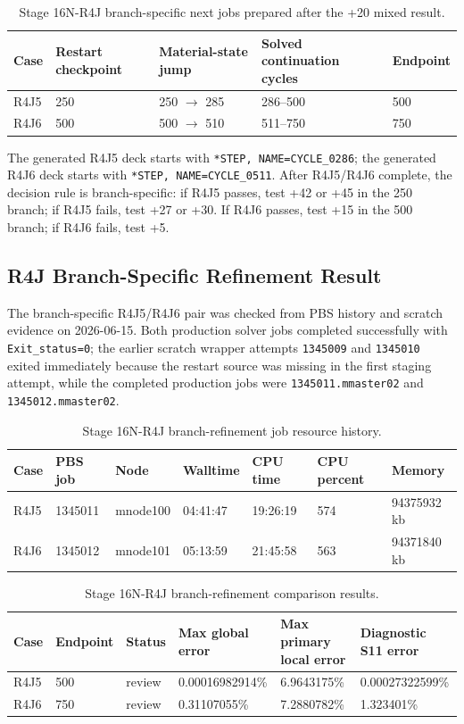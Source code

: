 \documentclass[11pt,a4paper]{article}
\newcommand{\code}[1]{\texttt{#1}}
\begin{document}
\begin{table}[H]
\centering
\caption{Stage 16N-R4J branch-specific next jobs prepared after the +20 mixed result.}
\begin{tabular}{lllll}
\toprule
Case & Restart checkpoint & Material-state jump & Solved continuation cycles & Endpoint \\
\midrule
R4J5 & 250 & 250 $\rightarrow$ 285 & 286--500 & 500 \\
R4J6 & 500 & 500 $\rightarrow$ 510 & 511--750 & 750 \\
\bottomrule
\end{tabular}
\end{table}

The generated R4J5 deck starts with \code{*STEP, NAME=CYCLE\_0286}; the generated R4J6 deck starts with \code{*STEP, NAME=CYCLE\_0511}. After R4J5/R4J6 complete, the decision rule is branch-specific: if R4J5 passes, test +42 or +45 in the 250 branch; if R4J5 fails, test +27 or +30. If R4J6 passes, test +15 in the 500 branch; if R4J6 fails, test +5.

\subsection{R4J Branch-Specific Refinement Result}

The branch-specific R4J5/R4J6 pair was checked from PBS history and scratch evidence on 2026-06-15. Both production solver jobs completed successfully with \code{Exit\_status=0}; the earlier scratch wrapper attempts \code{1345009} and \code{1345010} exited immediately because the restart source was missing in the first staging attempt, while the completed production jobs were \code{1345011.mmaster02} and \code{1345012.mmaster02}.

\begin{table}[H]
\centering
\caption{Stage 16N-R4J branch-refinement job resource history.}
\begin{tabular}{lllllll}
\toprule
Case & PBS job & Node & Walltime & CPU time & CPU percent & Memory \\
\midrule
R4J5 & 1345011 & mnode100 & 04:41:47 & 19:26:19 & 574 & 94375932 kb \\
R4J6 & 1345012 & mnode101 & 05:13:59 & 21:45:58 & 563 & 94371840 kb \\
\bottomrule
\end{tabular}
\end{table}

\begin{table}[H]
\centering
\caption{Stage 16N-R4J branch-refinement comparison results.}
\begin{tabular}{llllll}
\toprule
Case & Endpoint & Status & Max global error & Max primary local error & Diagnostic S11 error \\
\midrule
R4J5 & 500 & review & 0.00016982914\% & 6.9643175\% & 0.00027322599\% \\
R4J6 & 750 & review & 0.31107055\% & 7.2880782\% & 1.323401\% \\
\bottomrule
\end{tabular}
\end{table}
\end{document}
